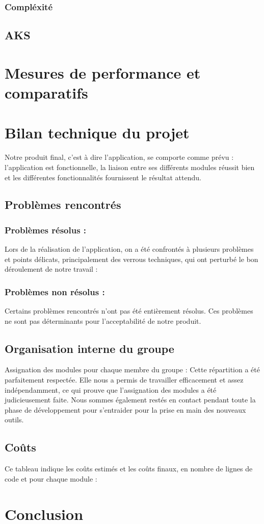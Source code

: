 		\subsubsection{Compléxité}
		
		
		\subsection{AKS}
		
	\section{Mesures de performance et comparatifs}
	
		
	\section{Bilan technique du projet}
		Notre produit final, c'est à dire l'application, se comporte comme prévu : l'application est fonctionnelle, la liaison entre ses différents modules réussit bien et les différentes fonctionnalités fournissent le résultat attendu.		

		\subsection{Problèmes rencontrés}
			\subsubsection*{Problèmes résolus :} 
			Lors de la réalisation de l'application, on a été confrontés à plusieurs problèmes et points délicats, principalement des verrous techniques, qui ont perturbé le bon déroulement de notre travail :
				
			\subsubsection*{Problèmes non résolus :}
				Certains problèmes rencontrés n'ont pas été entièrement résolus. Ces problèmes ne sont pas déterminants pour l'acceptabilité de notre produit.
				
		\subsection{Organisation interne du groupe}
		Assignation des modules pour chaque membre du groupe :
		Cette répartition a été parfaitement respectée. Elle nous a permis de travailler efficacement et assez indépendamment, ce qui prouve que l'assignation des modules a été judicieusement faite. Nous sommes également restés en contact pendant toute la phase de développement pour s'entraider pour la prise en main des nouveaux outils.
	
		\subsection{Coûts}
		Ce tableau indique les coûts estimés et les coûts finaux, en nombre de lignes de code et pour chaque module :
	
	\section*{Conclusion}
		

